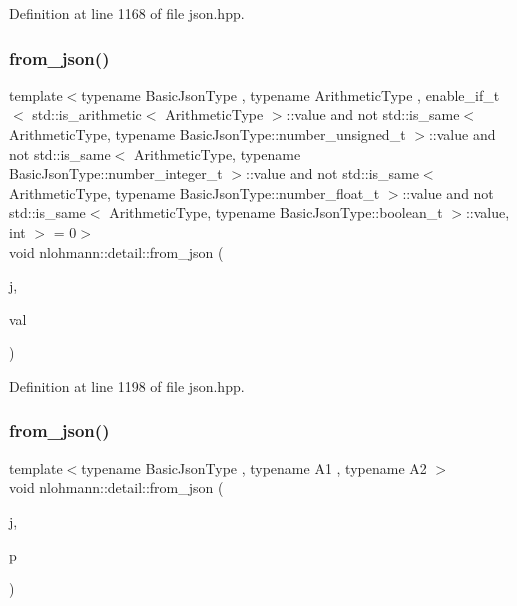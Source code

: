 Definition at line 1168 of file json.\+hpp.

\mbox{\label{namespacenlohmann_1_1detail_a839b0ab50d2c9bce669068f56bc41202}} 
\subsubsection{\texorpdfstring{from\+\_\+json()}{from\_json()}\hspace{0.1cm}{\footnotesize\ttfamily [14/18]}}
{\footnotesize\ttfamily template$<$typename Basic\+Json\+Type , typename Arithmetic\+Type , enable\+\_\+if\+\_\+t$<$ std\+::is\+\_\+arithmetic$<$ Arithmetic\+Type $>$\+::value and not std\+::is\+\_\+same$<$ Arithmetic\+Type, typename Basic\+Json\+Type\+::number\+\_\+unsigned\+\_\+t $>$\+::value and not std\+::is\+\_\+same$<$ Arithmetic\+Type, typename Basic\+Json\+Type\+::number\+\_\+integer\+\_\+t $>$\+::value and not std\+::is\+\_\+same$<$ Arithmetic\+Type, typename Basic\+Json\+Type\+::number\+\_\+float\+\_\+t $>$\+::value and not std\+::is\+\_\+same$<$ Arithmetic\+Type, typename Basic\+Json\+Type\+::boolean\+\_\+t $>$\+::value, int $>$  = 0$>$ \\
void nlohmann\+::detail\+::from\+\_\+json (\begin{DoxyParamCaption}\item[{const Basic\+Json\+Type \&}]{j,  }\item[{Arithmetic\+Type \&}]{val }\end{DoxyParamCaption})}



Definition at line 1198 of file json.\+hpp.

\mbox{\label{namespacenlohmann_1_1detail_aae9f9c2601074e323d49428132cc293d}} 
\subsubsection{\texorpdfstring{from\+\_\+json()}{from\_json()}\hspace{0.1cm}{\footnotesize\ttfamily [15/18]}}
{\footnotesize\ttfamily template$<$typename Basic\+Json\+Type , typename A1 , typename A2 $>$ \\
void nlohmann\+::detail\+::from\+\_\+json (\begin{DoxyParamCaption}\item[{const Basic\+Json\+Type \&}]{j,  }\item[{std\+::pair$<$ A1, A2 $>$ \&}]{p }\end{DoxyParamCaption})}



